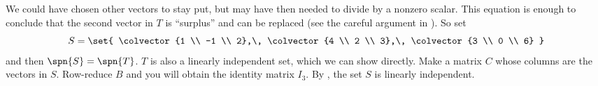 %
We could have chosen other vectors to stay put, but may have then needed to divide by a nonzero scalar.   This equation is enough to conclude that the second vector in $T$ is ``surplus'' and can be replaced (see the careful argument in ).  So set
%
\begin{equation*}
S=\set{
\colvector{1 \\ -1 \\ 2},\,
\colvector{4 \\ 2 \\ 3},\,
\colvector{3 \\ 0 \\ 6}
}
\end{equation*}
%
and then $\spn{S}=\spn{T}$.  $T$ is also a linearly independent set, which we can show directly.  Make a matrix $C$ whose columns are the vectors in $S$.  Row-reduce $B$ and you will obtain the identity matrix $I_3$.  By , the set $S$ is linearly independent.
